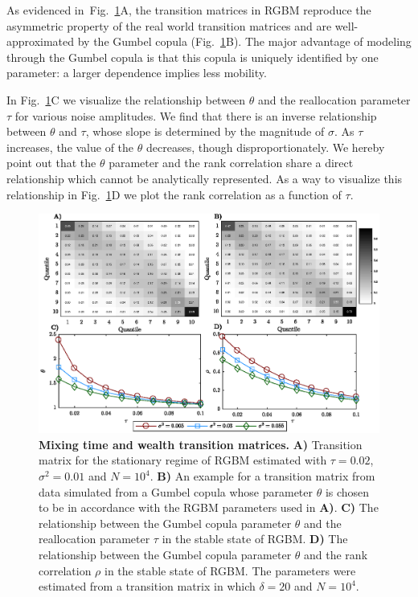 \documentclass[11pt]{article}
\newcommand{\fref}[1]{Fig.~\ref{fig:#1}}
\numberwithin{equation}{section}
\begin{document}
As evidenced in~\fref{rgbm-wealth-matrices}A, the transition matrices in RGBM reproduce the asymmetric property of the real world transition matrices and are well-approximated by the Gumbel copula (\fref{rgbm-wealth-matrices}B). The major advantage of modeling through the Gumbel copula is that this copula is uniquely identified by one parameter: a larger dependence implies less mobility.

In \fref{rgbm-wealth-matrices}C we visualize the relationship between $\theta$ and the reallocation parameter $\tau$ for various noise amplitudes. We find that there is an inverse relationship between $\theta$ and $\tau$, whose slope is determined by the magnitude of $\sigma$. As $\tau$ increases, the value of the $\theta$ decreases, though disproportionately. We hereby point out that the $\theta$ parameter and the rank correlation share a direct relationship which cannot be analytically represented. As a way to visualize this relationship in \fref{rgbm-wealth-matrices}D we plot the rank correlation as a function of $\tau$.

\begin{figure}[!htb]
\centering
\includegraphics[width=1.0\textwidth]{figs/fig_rgbm_gumbel_v2.eps}
\caption{\textbf{Mixing time and wealth transition matrices.} \textbf{A)} Transition matrix for the stationary regime of RGBM estimated with $\tau = 0.02$, $\sigma^2 = 0.01$ and $N = 10^4$. \textbf{B)} An example for a transition matrix from data simulated from a Gumbel copula whose parameter $\theta$ is chosen to be in accordance with the RGBM parameters used in \textbf{A)}. \textbf{C)} The relationship between the Gumbel copula parameter $\theta$ and the reallocation parameter $\tau$ in the stable state of RGBM. \textbf{D)} The relationship between the Gumbel copula parameter $\theta$ and the rank correlation $\rho$ in the stable state of RGBM. The parameters were estimated from a transition matrix in which $\delta = 20$ and $N = 10^4$.
\label{fig:rgbm-wealth-matrices}}
\end{figure}
\FloatBarrier
\end{document}
